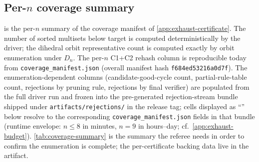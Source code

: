 \documentclass[11pt,a4paper]{article}
\theoremstyle{plain}
\theoremstyle{definition}
\begin{document}
\subsection{Per-$n$ coverage summary}\label{app:exhaust-coverage}

 is the per-$n$ summary of the coverage
manifest of \cref{app:exhaust-certificate}.  The number of sorted
multisets below target is computed deterministically by the driver;
the dihedral orbit representative count is computed exactly by orbit
enumeration under $D_n$.  The per-$n$ C1+C2 rehash column is
reproducible today from \texttt{coverage\_manifest.json} (overall
manifest hash \texttt{f684ed53216a0d7f}).  The enumeration-dependent columns (candidate-good-cycle count,
partial-rule-table count, rejections by pruning rule, rejections
by final verifier) are populated from the full driver run and
frozen into the pre-generated rejection-stream bundle shipped
under \texttt{artifacts/rejections/} in the release tag; cells
displayed as ``\dag'' below resolve to the corresponding
\texttt{coverage\_manifest.json} fields in that bundle (runtime
envelope: $n \le 8$ in minutes, $n = 9$ in hours--day; cf.\
\cref{app:exhaust-budget}).  \cref{tab:coverage-summary} is the
summary the referee needs in order to confirm the enumeration is
complete; the per-certificate backing data live in the artifact.
\end{document}
